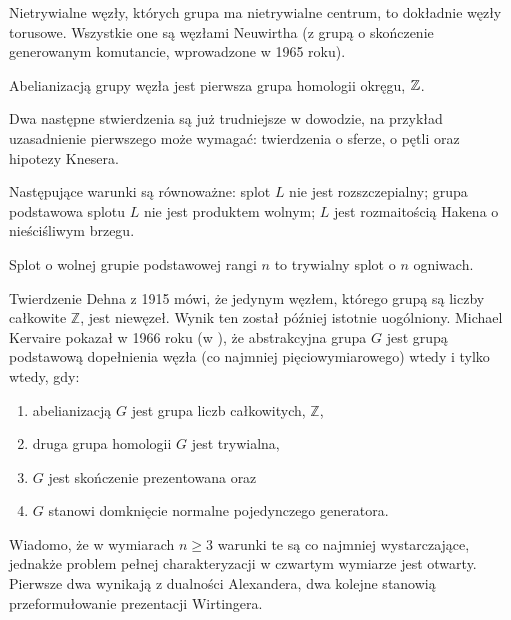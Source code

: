 
Nietrywialne węzły, których grupa ma nietrywialne centrum, to dokładnie węzły torusowe.
Wszystkie one są węzłami Neuwirtha
(z grupą o skończenie generowanym komutancie, wprowadzone w 1965 roku).

\begin{corollary}
    \label{prop:knot_group_abelianisation}
    Abelianizacją grupy węzła jest pierwsza grupa homologii okręgu, $\mathbb Z$.
\end{corollary}

Dwa następne stwierdzenia są już trudniejsze w dowodzie,
na przykład uzasadnienie pierwszego może wymagać:
twierdzenia o sferze, o pętli oraz hipotezy Knesera.

\begin{proposition}
    \label{prop:knot_group_split}
    Następujące warunki są równoważne:
    splot $L$ nie jest rozszczepialny;
    grupa podstawowa splotu $L$ nie jest produktem wolnym;
    $L$ jest rozmaitością Hakena o nieściśliwym brzegu.
\end{proposition}

\begin{proposition}
    \label{prop:knot_group_free}
    Splot o wolnej grupie podstawowej rangi $n$ to trywialny splot o $n$ ogniwach.
\end{proposition}

Twierdzenie Dehna z 1915 mówi, że jedynym węzłem,
którego grupą są liczby całkowite $\mathbb Z$, jest niewęzeł.
Wynik ten został później istotnie uogólniony.
Michael Kervaire pokazał w 1966 roku (w \cite{kervaire65}),
że abstrakcyjna grupa $G$ jest grupą podstawową dopełnienia węzła
(co najmniej pięciowymiarowego) wtedy i tylko wtedy, gdy:
\begin{enumerate}[leftmargin=*]
    \itemsep0em
    \item abelianizacją $G$ jest grupa liczb całkowitych, $\mathbb Z$,
    \item druga grupa homologii $G$ jest trywialna,
    \item $G$ jest skończenie prezentowana oraz
    \item $G$ stanowi domknięcie normalne pojedynczego generatora.
\end{enumerate}

Wiadomo, że w wymiarach $n \ge 3$ warunki te są co najmniej wystarczające,
jednakże problem  pełnej charakteryzacji w czwartym wymiarze jest otwarty.
Pierwsze dwa wynikają z dualności Alexandera,
dwa kolejne stanowią przeformułowanie prezentacji Wirtingera.

